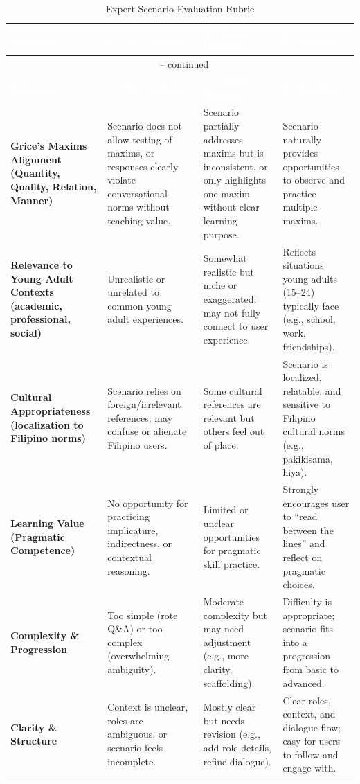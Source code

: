 \begin{longtable}{p{3.6cm} p{3.5cm} p{3.5cm} p{3.5cm}}
\caption{Expert Scenario Evaluation Rubric}
\label{fig:expert_evaluation_rubric} \\

\rowcolor{headerblue}
\textcolor{white}{\textbf{Criterion}} &
\textcolor{white}{\textbf{0 - Not Suitable}} &
\textcolor{white}{\textbf{1 - Needs Revision}} &
\textcolor{white}{\textbf{2 - Suitable}} \\
\endfirsthead

\multicolumn{4}{c}{\tablename\ \thetable{} -- continued} \\
\rowcolor{headerblue}
\textcolor{white}{\textbf{Criterion}} &
\textcolor{white}{\textbf{0 - Not Suitable}} &
\textcolor{white}{\textbf{1 - Needs Revision}} &
\textcolor{white}{\textbf{2 - Suitable}} \\
\endhead

\midrule
\textbf{Grice's Maxims Alignment (Quantity, Quality, Relation, Manner)} &
Scenario does not allow testing of maxims, or responses clearly violate conversational norms without teaching value. &
Scenario partially addresses maxims but is inconsistent, or only highlights one maxim without clear learning purpose. &
Scenario naturally provides opportunities to observe and practice multiple maxims. \\
\midrule
\textbf{Relevance to Young Adult Contexts (academic, professional, social)} &
Unrealistic or unrelated to common young adult experiences. &
Somewhat realistic but niche or exaggerated; may not fully connect to user experience. &
Reflects situations young adults (15--24) typically face (e.g., school, work, friendships). \\
\midrule
\textbf{Cultural Appropriateness (localization to Filipino norms)} &
Scenario relies on foreign/irrelevant references; may confuse or alienate Filipino users. &
Some cultural references are relevant but others feel out of place. &
Scenario is localized, relatable, and sensitive to Filipino cultural norms (e.g., pakikisama, hiya). \\
\midrule
\textbf{Learning Value (Pragmatic Competence)} &
No opportunity for practicing implicature, indirectness, or contextual reasoning. &
Limited or unclear opportunities for pragmatic skill practice. &
Strongly encourages user to ``read between the lines'' and reflect on pragmatic choices. \\
\midrule
\textbf{Complexity \& Progression} &
Too simple (rote Q\&A) or too complex (overwhelming ambiguity). &
Moderate complexity but may need adjustment (e.g., more clarity, scaffolding). &
Difficulty is appropriate; scenario fits into a progression from basic to advanced. \\
\midrule
\textbf{Clarity \& Structure} &
Context is unclear, roles are ambiguous, or scenario feels incomplete. &
Mostly clear but needs revision (e.g., add role details, refine dialogue). &
Clear roles, context, and dialogue flow; easy for users to follow and engage with. \\
\bottomrule
\end{longtable}


